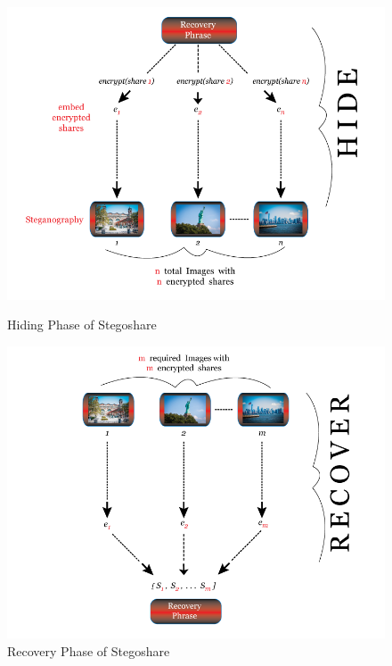 \begin{figure}
\centering
\begin{minipage}{.5\textwidth}
  \centering
	\includegraphics[scale = 0.29]{hide_slide-3.png}
	\caption{Hiding Phase of Stegoshare}
	\label{fig: Hiding Phas}
\end{minipage}%
\begin{minipage}{.5\textwidth}
  \centering
	\includegraphics[scale = 0.29]{recover_slide-3.png}
	\caption{Recovery Phase of Stegoshare}
	\label{fig: Recovery Phas}
\end{minipage}
\end{figure}
